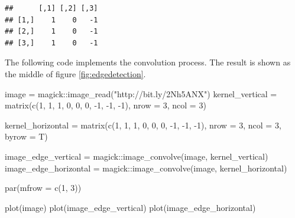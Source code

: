 \documentclass[
  12pt,
]{krantz}
\makeatletter
\newenvironment{Shaded}{\begin{snugshade}}{\end{snugshade}}
\newcommand{\AttributeTok}[1]{\textcolor[rgb]{0.61,0.61,0.61}{#1}}
\newcommand{\DecValTok}[1]{\textcolor[rgb]{0.06,0.06,0.06}{#1}}
\newcommand{\FunctionTok}[1]{\textcolor[rgb]{0,0,0}{#1}}
\newcommand{\NormalTok}[1]{#1}
\newcommand{\OtherTok}[1]{\textcolor[rgb]{0.37,0.37,0.37}{#1}}
\newcommand{\SpecialCharTok}[1]{\textcolor[rgb]{0,0,0}{#1}}
\newcommand{\StringTok}[1]{\textcolor[rgb]{0.5,0.5,0.5}{#1}}
\newenvironment{kframe}{%
\medskip{}
\setlength{\fboxsep}{.8em}
 \def\at@end@of@kframe{}%
 \ifinner\ifhmode%
  \def\at@end@of@kframe{\end{minipage}}%
  \begin{minipage}{\columnwidth}%
 \fi\fi%
 \def\FrameCommand##1{\hskip\@totalleftmargin \hskip-\fboxsep
 \colorbox{shadecolor}{##1}\hskip-\fboxsep
     \hskip-\linewidth \hskip-\@totalleftmargin \hskip\columnwidth}%
 \MakeFramed {\advance\hsize-\width
   \@totalleftmargin\z@ \linewidth\hsize
   \@setminipage}}%
 {\par\unskip\endMakeFramed%
 \at@end@of@kframe}
\renewenvironment{Shaded}{\begin{kframe}}{\end{kframe}}
\makeatother
\begin{document}
\begin{verbatim}
##      [,1] [,2] [,3]
## [1,]    1    0   -1
## [2,]    1    0   -1
## [3,]    1    0   -1
\end{verbatim}

The following code implements the convolution process. The result is shown as the middle of figure \ref{fig:edgedetection}.

\begin{Shaded}
\begin{Highlighting}[]
\NormalTok{image }\OtherTok{=}\NormalTok{ magick}\SpecialCharTok{::}\FunctionTok{image\_read}\NormalTok{(}\StringTok{"http://bit.ly/2Nh5ANX"}\NormalTok{)}
\NormalTok{kernel\_vertical }\OtherTok{=} \FunctionTok{matrix}\NormalTok{(}\FunctionTok{c}\NormalTok{(}\DecValTok{1}\NormalTok{, }\DecValTok{1}\NormalTok{, }\DecValTok{1}\NormalTok{, }\DecValTok{0}\NormalTok{, }\DecValTok{0}\NormalTok{, }\DecValTok{0}\NormalTok{, }\SpecialCharTok{{-}}\DecValTok{1}\NormalTok{, }\SpecialCharTok{{-}}\DecValTok{1}\NormalTok{, }\SpecialCharTok{{-}}\DecValTok{1}\NormalTok{),}
                       \AttributeTok{nrow =} \DecValTok{3}\NormalTok{, }\AttributeTok{ncol =} \DecValTok{3}\NormalTok{)}

\NormalTok{kernel\_horizontal }\OtherTok{=} \FunctionTok{matrix}\NormalTok{(}\FunctionTok{c}\NormalTok{(}\DecValTok{1}\NormalTok{, }\DecValTok{1}\NormalTok{, }\DecValTok{1}\NormalTok{, }\DecValTok{0}\NormalTok{, }\DecValTok{0}\NormalTok{, }\DecValTok{0}\NormalTok{, }\SpecialCharTok{{-}}\DecValTok{1}\NormalTok{, }\SpecialCharTok{{-}}\DecValTok{1}\NormalTok{, }\SpecialCharTok{{-}}\DecValTok{1}\NormalTok{),}
                       \AttributeTok{nrow =} \DecValTok{3}\NormalTok{, }\AttributeTok{ncol =} \DecValTok{3}\NormalTok{, }\AttributeTok{byrow =}\NormalTok{ T)}

\NormalTok{image\_edge\_vertical }\OtherTok{=}\NormalTok{ magick}\SpecialCharTok{::}\FunctionTok{image\_convolve}\NormalTok{(image, kernel\_vertical)}
\NormalTok{image\_edge\_horizontal }\OtherTok{=}\NormalTok{ magick}\SpecialCharTok{::}\FunctionTok{image\_convolve}\NormalTok{(image, kernel\_horizontal)}

\FunctionTok{par}\NormalTok{(}\AttributeTok{mfrow =} \FunctionTok{c}\NormalTok{(}\DecValTok{1}\NormalTok{, }\DecValTok{3}\NormalTok{))}

\FunctionTok{plot}\NormalTok{(image)}
\FunctionTok{plot}\NormalTok{(image\_edge\_vertical)}
\FunctionTok{plot}\NormalTok{(image\_edge\_horizontal)}
\end{Highlighting}
\end{Shaded}
\end{document}
